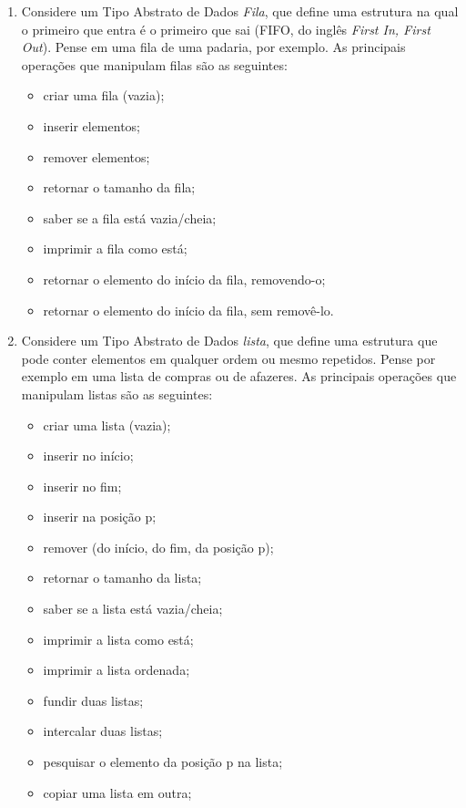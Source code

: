 \begin{enumerate}
\item Considere um Tipo Abstrato de Dados \emph{Fila}, que define
uma estrutura na qual o primeiro que entra é o primeiro que sai
(FIFO, do inglês \emph{First In, First Out}). Pense em uma fila
de uma padaria, por exemplo. As principais operações que manipulam
filas são as seguintes:

\begin{itemize}
   \item criar uma fila (vazia);
   \item inserir elementos;
   \item remover elementos;
   \item retornar o tamanho da fila;
   \item saber se a fila está vazia/cheia;
   \item imprimir a fila como está;
   \item retornar o elemento do início da fila, removendo-o;
   \item retornar o elemento do início da fila, sem removê-lo.
\end{itemize}

\item Considere um Tipo Abstrato de Dados \emph{lista}, que define
uma estrutura que pode conter elementos em qualquer ordem ou mesmo
repetidos. Pense por exemplo em uma lista de compras ou de afazeres.
As principais operações que manipulam listas são as seguintes:
\begin{itemize}
   \item criar uma lista (vazia);
   \item inserir no início;
   \item inserir no fim;
   \item inserir na posição p;
   \item remover (do início, do fim, da posição p);
   \item retornar o tamanho da lista;
   \item saber se a lista está vazia/cheia;
   \item imprimir a lista como está;
   \item imprimir a lista ordenada;
   \item fundir duas listas;
   \item intercalar duas listas;
   \item pesquisar o elemento da posição p na lista;
   \item copiar uma lista em outra;
\end{itemize}


\end{enumerate}
